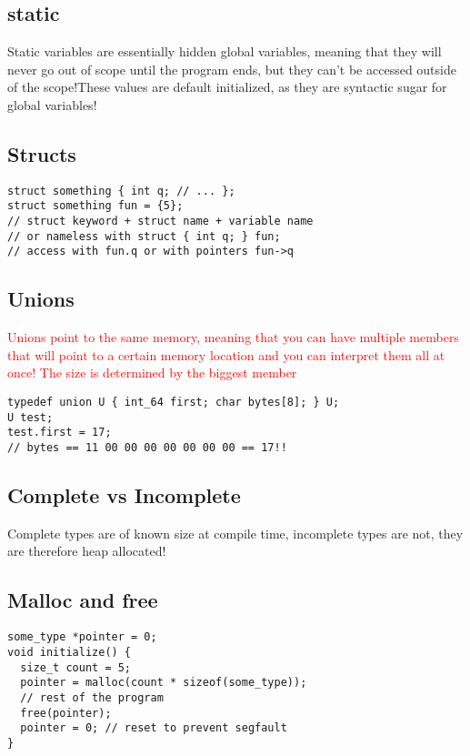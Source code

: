 \documentclass[main.tex,fontsize=8pt,paper=a4,paper=landscape,DIV=calc,]{scrartcl}
\begin{document}
\begin{multicols*}{4}
\subsection{static}
Static variables are essentially hidden global variables, meaning that they will never go out of scope until the program ends, but they can't be accessed outside of the scope!These values are default initialized, as they are syntactic sugar for global variables!

\subsection{Structs}
\begin{lstlisting}
struct something { int q; // ... };
struct something fun = {5};
// struct keyword + struct name + variable name
// or nameless with struct { int q; } fun;
// access with fun.q or with pointers fun->q
\end{lstlisting}
\vspace{2mm}

\subsection{Unions}
\textcolor{red}{Unions point to the same memory, meaning that you can have multiple members that will point to a certain memory location and you can interpret them all at once! The size is determined by the biggest member}
\begin{lstlisting}
typedef union U { int_64 first; char bytes[8]; } U;
U test;
test.first = 17;
// bytes == 11 00 00 00 00 00 00 00 == 17!!
\end{lstlisting}
\vspace{2mm}

\subsection{Complete vs Incomplete}
Complete types are of known size at compile time, incomplete types are not, they are therefore heap allocated!

\subsection{Malloc and free}
\begin{lstlisting}
some_type *pointer = 0;
void initialize() {
  size_t count = 5;
  pointer = malloc(count * sizeof(some_type));
  // rest of the program 
  free(pointer);
  pointer = 0; // reset to prevent segfault
}
\end{lstlisting}


\end{multicols*}
\end{document}

